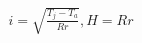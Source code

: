\documentclass[12pt]{article}
\begin{document}
\begin{align*}
i = \sqrt{\frac{T_j - T_a}{Rr}}, H = Rr
\end{align*}
\end{document}
